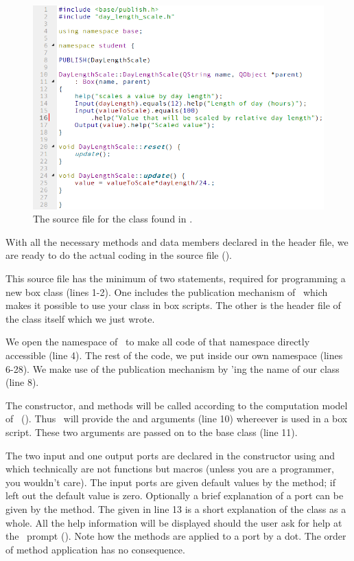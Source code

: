 \begin{figure}
\centering
\includegraphics[scale=0.7]{graphics/qt-creator-day-length-scale-cpp}
\caption{The source file for the  class found in .}
\label{fig:qt-creator-day-length-scale-cpp}
\end{figure}

With all the necessary methods and data members declared in the header file, we are ready to do the actual coding in the source file ().

This source file has the minimum of two  statements, required for programming a new box class (lines 1-2). One includes the publication mechanism of \US\ which makes it possible to use your class in box scripts. The other is the header file of the class itself which we just wrote.

We open the  namespace of \US\ to make all code of that namespace directly accessible (line 4). The rest of the code, we put inside our own namespace  (lines 6-28). We make use of the publication mechanism by 'ing the name of our class (line 8).

The constructor,  and  methods will be called according to the computation model of \US\ (). Thus \US\ will provide the  and  arguments (line 10) whereever  is used in a box script. These two arguments are passed on to the  base class (line 11).

The two input and one output ports are declared in the constructor using  and  which technically are not functions but macros (unless you are a programmer, you wouldn't care). The input ports are given default values by the  method; if left out the default value is zero. Optionally a brief explanation of a port can be given by the  method. The  given in line 13 is a short explanation of the class as a whole. All the help information will be displayed should the user ask for  help at the \US\ prompt (). Note how the methods are applied to a port by a dot. The order of method application has no consequence.

